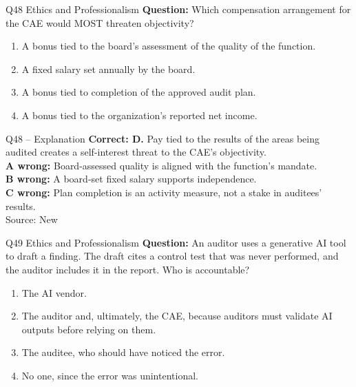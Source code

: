 \documentclass[aspectratio=169,10pt]{beamer}
\begin{document}
\begin{frame}[t]{Q48 \hfill {\scriptsize Ethics and Professionalism}}
	\small
	\textbf{Question:} Which compensation arrangement for the CAE would MOST threaten objectivity?
	\begin{enumerate}[label=\Alph*.,itemsep=1pt,topsep=3pt]
			\item A bonus tied to the board's assessment of the quality of the function.
			\item A fixed salary set annually by the board.
			\item A bonus tied to completion of the approved audit plan.
			\item A bonus tied to the organization's reported net income.
	\end{enumerate}
\end{frame}

\begin{frame}[t]{Q48 -- Explanation}
	\footnotesize
	\textbf{Correct: D.} Pay tied to the results of the areas being audited creates a self-interest threat to the CAE's objectivity. \\[5pt]
\textbf{A wrong:} Board-assessed quality is aligned with the function's mandate. \\[3pt]
\textbf{B wrong:} A board-set fixed salary supports independence. \\[3pt]
\textbf{C wrong:} Plan completion is an activity measure, not a stake in auditees' results. \\[3pt]
	\vfill {\tiny Source: New}
\end{frame}

\begin{frame}[t]{Q49 \hfill {\scriptsize Ethics and Professionalism}}
	\small
	\textbf{Question:} An auditor uses a generative AI tool to draft a finding. The draft cites a control test that was never performed, and the auditor includes it in the report. Who is accountable?
	\begin{enumerate}[label=\Alph*.,itemsep=1pt,topsep=3pt]
			\item The AI vendor.
			\item The auditor and, ultimately, the CAE, because auditors must validate AI outputs before relying on them.
			\item The auditee, who should have noticed the error.
			\item No one, since the error was unintentional.
	\end{enumerate}
\end{frame}
\end{document}
